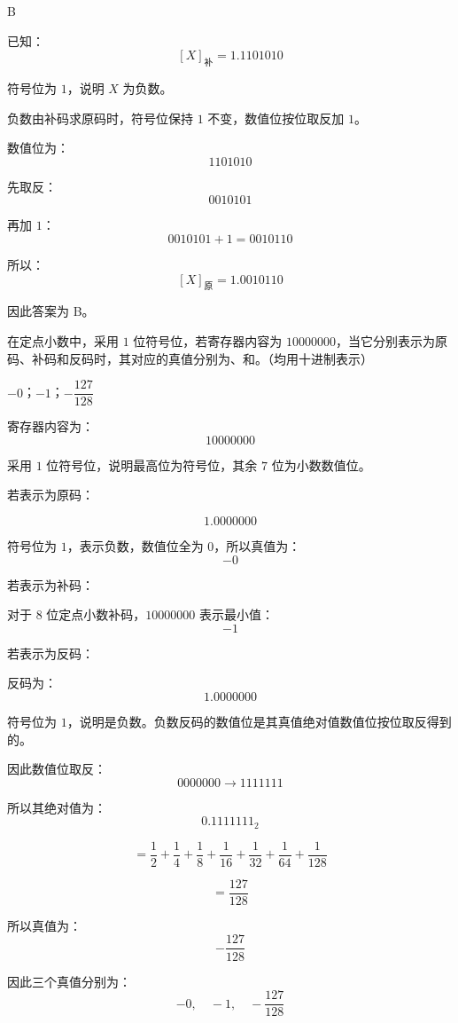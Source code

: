 \begin{answer}
B
\end{answer}

\begin{analysisenv}
已知：
\[
[X]_{\text{补}}=1.1101010
\]

符号位为 $1$，说明 $X$ 为负数。

负数由补码求原码时，符号位保持 $1$ 不变，数值位按位取反加 $1$。

数值位为：
\[
1101010
\]

先取反：
\[
0010101
\]

再加 $1$：
\[
0010101+1=0010110
\]

所以：
\[
[X]_{\text{原}}=1.0010110
\]

因此答案为 B。
\end{analysisenv}


\begin{question}
在定点小数中，采用 $1$ 位符号位，若寄存器内容为 $10000000$，当它分别表示为原码、补码和反码时，其对应的真值分别为\underline{\hspace{2cm}}、\underline{\hspace{2cm}}和\underline{\hspace{2cm}}。（均用十进制表示）
\end{question}

\begin{answer}
$-0$；$-1$；$-\dfrac{127}{128}$
\end{answer}

\begin{analysisenv}
寄存器内容为：
\[
10000000
\]

采用 $1$ 位符号位，说明最高位为符号位，其余 $7$ 位为小数数值位。

若表示为原码：

\[
1.0000000
\]

符号位为 $1$，表示负数，数值位全为 $0$，所以真值为：
\[
-0
\]

若表示为补码：

对于 $8$ 位定点小数补码，$10000000$ 表示最小值：
\[
-1
\]

若表示为反码：

反码为：
\[
1.0000000
\]

符号位为 $1$，说明是负数。负数反码的数值位是其真值绝对值数值位按位取反得到的。

因此数值位取反：
\[
0000000 \rightarrow 1111111
\]

所以其绝对值为：
\[
0.1111111_2
\]

\[
= \frac{1}{2}+\frac{1}{4}+\frac{1}{8}+\frac{1}{16}+\frac{1}{32}+\frac{1}{64}+\frac{1}{128}
\]

\[
= \frac{127}{128}
\]

所以真值为：
\[
-\frac{127}{128}
\]

因此三个真值分别为：
\[
-0,\quad -1,\quad -\frac{127}{128}
\]
\end{analysisenv}



